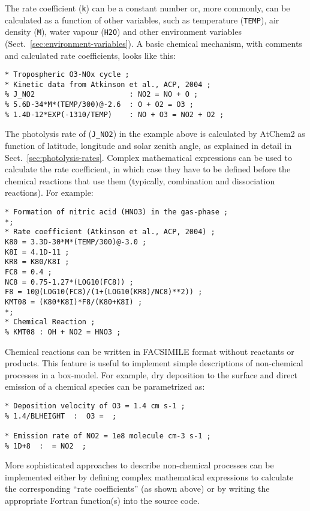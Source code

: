The rate coefficient (\texttt{k}) can be a constant number or, more
commonly, can be calculated as a function of other variables, such as
temperature (\texttt{TEMP}), air density (\texttt{M}), water vapour
(\texttt{H2O}) and other environment variables
(Sect.~\ref{sec:environment-variables}). A basic chemical mechanism,
with comments and calculated rate coefficients, looks like this:

\begin{verbatim}
* Tropospheric O3-NOx cycle ;
* Kinetic data from Atkinson et al., ACP, 2004 ;
% J_NO2                      : NO2 = NO + O ;
% 5.6D-34*M*(TEMP/300)@-2.6  : O + O2 = O3 ;
% 1.4D-12*EXP(-1310/TEMP)    : NO + O3 = NO2 + O2 ;
\end{verbatim}

The photolysis rate of  (\texttt{J\_NO2}) in the example above
is calculated by AtChem2 as function of latitude, longitude and solar
zenith angle, as explained in detail in Sect.~\ref{sec:photolysis-rates}.
Complex mathematical expressions can be used to calculate the rate
coefficient, in which case they have to be defined before the chemical
reactions that use them (typically, combination and dissociation
reactions). For example:

\begin{verbatim}
* Formation of nitric acid (HNO3) in the gas-phase ;
*;
* Rate coefficient (Atkinson et al., ACP, 2004) ;
K80 = 3.3D-30*M*(TEMP/300)@-3.0 ;
K8I = 4.1D-11 ;
KR8 = K80/K8I ;
FC8 = 0.4 ;
NC8 = 0.75-1.27*(LOG10(FC8)) ;
F8 = 10@(LOG10(FC8)/(1+(LOG10(KR8)/NC8)**2)) ;
KMT08 = (K80*K8I)*F8/(K80+K8I) ;
*;
* Chemical Reaction ;
% KMT08 : OH + NO2 = HNO3 ;
\end{verbatim}

Chemical reactions can be written in FACSIMILE format without
reactants or products. This feature is useful to implement simple
descriptions of non-chemical processes in a box-model. For example,
dry deposition to the surface and direct emission of a chemical
species can be parametrized as:

\begin{verbatim}
* Deposition velocity of O3 = 1.4 cm s-1 ;
% 1.4/BLHEIGHT  :  O3 =  ;

* Emission rate of NO2 = 1e8 molecule cm-3 s-1 ;
% 1D+8  :  = NO2  ;
\end{verbatim}

More sophisticated approaches to describe non-chemical processes can
be implemented either by defining complex mathematical expressions to
calculate the corresponding ``rate coefficients'' (as shown above) or
by writing the appropriate Fortran function(s) into the source code.

